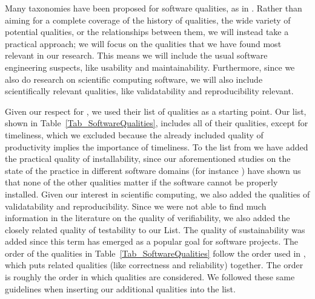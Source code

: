 \documentclass[letterpaper, cleveref]{lipics-v2019}
\theoremstyle{definition}
\begin{document}
Many taxonomies have been proposed for software qualities, as in
\citet{McCallEtAl1977, boehm1976quantitative, ISO9126}. Rather than aiming for a
complete coverage of the history of qualities, the wide variety of potential
qualities, or the relationships between them, we will instead take a practical
approach; we will focus on the qualities that we have found most relevant in our
research.  This means we will include the usual software engineering suspects,
like usability and maintainability.  Furthermore, since we also do research on
scientific computing software, we will also include scientifically relevant
qualities, like validatability and reproducibility relevant.

Given our respect for \citet[p.\ 15--33]{GhezziEtAl2003}, we used their list of
qualities as a starting point. Our list, shown in
Table~\ref{Tab_SoftwareQualities}, includes all of their qualities, except for
timeliness, which we excluded because the already included quality of
productivity implies the importance of timeliness.  To the list from
\citet{GhezziEtAl2003} we have added the practical quality of installability,
since our aforementioned studies on the state of the practice in different
software domains (for instance \citet{SmithEtAl2018_arXivGIS}) have shown us
that none of the other qualities matter if the software cannot be properly
installed.  Given our interest in scientific computing, we also added the
qualities of validatability and reproducibility. Since we were not able to find
much information in the literature on the quality of verifiability, we also
added the closely related quality of testability to our List.  The quality of
sustainability was added since this term has emerged as a popular goal for
software projects. The order of the qualities in
Table~\ref{Tab_SoftwareQualities} follow the order used in
\cite{GhezziEtAl2003}, which puts related qualities (like correctness and
reliability) together.  The order is roughly the order in which qualities are
considered.  We followed these same guidelines when inserting our additional
qualities into the list.
\end{document}
